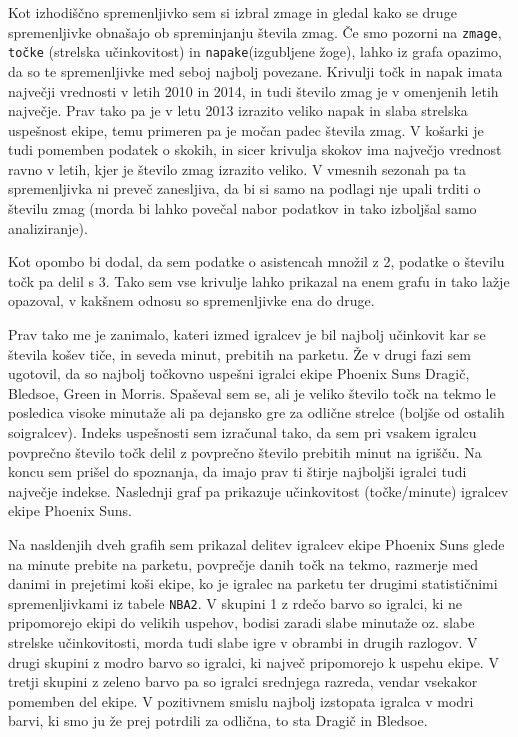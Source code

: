 \documentclass[11pt,a4paper]{article}
\begin{document}
\smallskip

\newpage
Kot izhodiščno spremenljivko sem si izbral zmage in gledal kako se druge spremenljivke obnašajo ob spreminjanju števila zmag. Če smo pozorni na \verb|zmage|, \verb|točke| (strelska učinkovitost) in \verb|napake|(izgubljene žoge), lahko iz grafa opazimo, da so te spremenljivke med seboj najbolj povezane. Krivulji točk in napak imata največji vrednosti v letih 2010 in 2014, in tudi število zmag je v omenjenih letih največje. Prav tako pa je v letu 2013 izrazito veliko napak in slaba strelska uspešnost ekipe, temu primeren pa je močan padec števila zmag. V košarki je tudi pomemben podatek o skokih, in sicer krivulja skokov ima največjo vrednost ravno v letih, kjer je število zmag izrazito veliko. V vmesnih sezonah pa ta spremenljivka ni preveč zanesljiva, da bi si samo na podlagi nje upali trditi o številu zmag (morda bi lahko povečal nabor podatkov in tako izboljšal samo analiziranje).
\smallskip

Kot opombo bi dodal, da sem podatke o asistencah množil z 2, podatke o številu točk pa delil s 3. Tako sem vse krivulje lahko prikazal na enem grafu in tako lažje opazoval, v kakšnem odnosu so spremenljivke ena do druge.

\medskip

Prav tako me je zanimalo, kateri izmed igralcev je bil najbolj učinkovit kar se števila košev tiče, in seveda minut, prebitih na parketu. Že v drugi fazi sem ugotovil, da so najbolj točkovno uspešni igralci ekipe Phoenix Suns Dragič, Bledsoe, Green in Morris. Spaševal sem se, ali je veliko število točk na tekmo le posledica visoke minutaže ali pa dejansko gre za odlične strelce (boljše od ostalih soigralcev). Indeks uspešnosti sem izračunal tako, da sem pri vsakem igralcu povprečno število točk delil z povprečno število prebitih minut na igrišču. Na koncu sem prišel do spoznanja, da imajo prav ti štirje najboljši igralci tudi največje indekse. Naslednji graf pa prikazuje učinkovitost (točke/minute) igralcev ekipe Phoenix Suns.
\medskip


Na nasldenjih dveh grafih sem prikazal delitev igralcev ekipe Phoenix Suns glede na minute prebite na parketu, povprečje danih točk na tekmo, razmerje med danimi in prejetimi koši ekipe, ko je igralec na parketu ter drugimi statističnimi spremenljivkami iz tabele \verb|NBA2|. V skupini 1 z rdečo barvo so igralci, ki ne pripomorejo ekipi do velikih uspehov, bodisi zaradi slabe minutaže oz. slabe strelske učinkovitosti, morda tudi slabe igre v obrambi in drugih razlogov. V drugi skupini z modro barvo so igralci, ki največ pripomorejo k uspehu ekipe. V tretji skupini z zeleno barvo pa so igralci srednjega razreda, vendar vsekakor pomemben del ekipe. V pozitivnem smislu najbolj izstopata igralca v modri barvi, ki smo ju že prej potrdili za odlična, to sta Dragič in Bledsoe.
\end{document}

